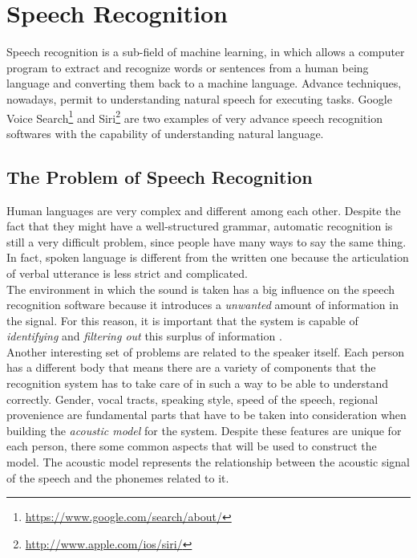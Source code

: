 \chapter{Speech Recognition}
\label{chap:Speech Recognition}
Speech recognition is a sub-field of machine learning, in which allows a computer program to extract and recognize words or sentences from a human being language and converting them back to a machine language. Advance techniques, nowadays, permit to understanding natural speech for executing tasks. Google Voice Search\footnote{\url{https://www.google.com/search/about/}} and Siri\footnote{\url{http://www.apple.com/ios/siri/}} are two examples of very advance speech recognition softwares with the capability of understanding natural language.

\section{The Problem of Speech Recognition}
\label{sec:The Problem of Speech Recognition}
Human languages are very complex and different among each other.  Despite the fact that they might have a well-structured grammar, automatic recognition is still a very difficult problem, since people have many ways to say the same thing. In fact, spoken language is different from the written one because the articulation of verbal utterance is less strict and complicated. \\
The environment in which the sound is taken has a big influence on the speech recognition software because it introduces a \textit{unwanted} amount of information in the signal. For this reason, it is important that the system is capable of \textit{identifying} and \textit{filtering out} this surplus of information \cite{forsberg2003speech}. \\

\noindent Another interesting set of problems are related to the speaker itself. Each person has a different body that means there are a variety of components that the recognition system has to take care of in such a way to be able to understand correctly. Gender, vocal tracts, speaking style, speed of the speech, regional provenience are fundamental parts that have to be taken into consideration when building the \textit{acoustic model} for the system. Despite these features are unique for each person, there some common aspects that will be used to construct the model. The acoustic model represents the relationship between the acoustic signal of the speech and the phonemes related to it. \\

